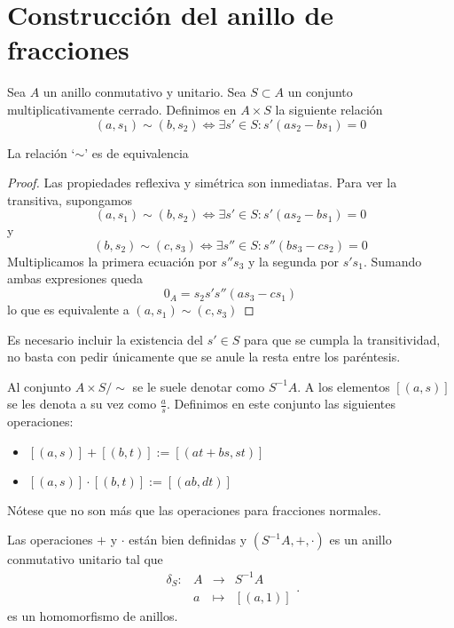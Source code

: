 \documentclass[../main.tex]{subfiles}
\begin{document}
\section{Construcción del anillo de fracciones}
Sea $A$ un anillo conmutativo y unitario. Sea $S\subset A$ un conjunto multiplicativamente cerrado. Definimos en $A\times S$ la siguiente relación$$(a,s_1)\sim (b,s_2)\iff \exists s'\in S : s'(as_2-bs_1)=0$$
\begin{proposition}
La relación `$\sim$' es de equivalencia
\end{proposition}
\begin{proof}
Las propiedades reflexiva y simétrica son inmediatas. Para ver la transitiva, supongamos\begin{equation}
    (a,s_1)\sim (b,s_2)\iff \exists s'\in S : s'(as_2-bs_1)=0
\end{equation} y \begin{equation}
    (b,s_2)\sim (c,s_3)\iff \exists s''\in S : s''(bs_3-cs_2)=0
\end{equation}
Multiplicamos la primera ecuación por $s''s_3$ y la segunda por $s's_1$. Sumando ambas expresiones queda $$0_A=s_2s's''(as_3-cs_1)$$ lo que es equivalente a $(a,s_1)\sim (c,s_3)$
\end{proof}
\begin{remark}
Es necesario incluir la existencia del $s'\in S$ para que se cumpla la transitividad, no basta con pedir únicamente que se anule la resta entre los paréntesis.
\end{remark}
Al conjunto $A\times S/\sim$ se le suele denotar como $S^{-1}A$. A los elementos $[(a,s)]$ se les denota a su vez como $\frac{a}{s}$. Definimos en este conjunto las siguientes operaciones: \begin{itemize}
    \item $[(a,s)]+[(b,t)]:=[(at+bs,st)]$
    \item $[(a,s)]\cdot[(b,t)]:=[(ab,dt)]$
\end{itemize}
Nótese que no son más que las operaciones para fracciones normales.
\begin{proposition}
Las operaciones $+$ y $\cdot$ están bien definidas y $(S^{-1}A, +, \cdot)$ es un anillo conmutativo unitario tal que 
$$
    \begin{array}{rrcl}
	\delta_S:&A&\longrightarrow&S^{-1}A\\
	&a&\longmapsto&[(a,1)]
	\end{array}.$$ es un homomorfismo de anillos.
\end{proposition}
\end{document}
